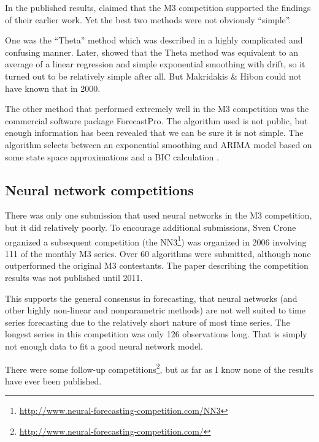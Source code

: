\documentclass[11pt,a4paper,]{article}
\begin{document}
In the published results, \autocite{M3} claimed that the M3 competition supported the findings of their earlier work. Yet the best two methods were not obviously ``simple''.

One was the ``Theta'' method which was described in a highly complicated and confusing manner. Later, \textcite{HB03} showed that the Theta method was equivalent to an average of a linear regression and simple exponential smoothing with drift, so it turned out to be relatively simple after all. But Makridakis \& Hibon could not have known that in 2000.

The other method that performed extremely well in the M3 competition was the commercial software package ForecastPro. The algorithm used is not public, but enough information has been revealed that we can be sure it is not simple. The algorithm selects between an exponential smoothing and ARIMA model based on some state space approximations and a BIC calculation \autocite{Goodrich2000}.

\hypertarget{neural-network-competitions}{%
\subsection*{Neural network competitions}\label{neural-network-competitions}}

There was only one submission that used neural networks in the M3 competition, but it did relatively poorly. To encourage additional submissions, Sven Crone organized a subsequent competition (the NN3\footnote{\url{http://www.neural-forecasting-competition.com/NN3}}) was organized in 2006 involving 111 of the monthly M3 series. Over 60 algorithms were submitted, although none outperformed the original M3 contestants. The paper describing the competition results \autocite{NN3} was not published until 2011.

This supports the general consensus in forecasting, that neural networks (and other highly non-linear and nonparametric methods) are not well suited to time series forecasting due to the relatively short nature of most time series. The longest series in this competition was only 126 observations long. That is simply not enough data to fit a good neural network model.

There were some follow-up competitions\footnote{\url{http://www.neural-forecasting-competition.com/}}, but as far as I know none of the results have ever been published.
\end{document}
